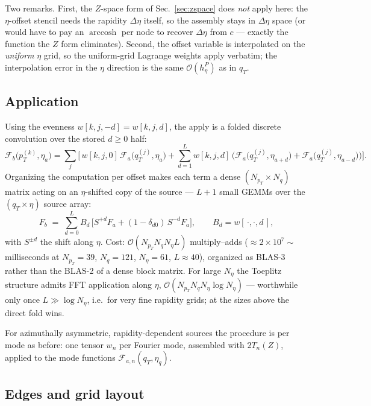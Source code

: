\documentclass[11pt]{article}
\newcommand{\Fa}{\mathcal{F}_a}
\newcommand{\Fb}{\mathcal{F}_b}
\newcommand{\Fan}{\mathcal{F}_{a,n}}
\begin{document}
Two remarks.  First, the $Z$-space form of Sec.~\ref{sec:zspace} does
\emph{not} apply here: the $\eta$-offset stencil needs the rapidity
$\Delta\eta$ itself, so the assembly stays in $\Delta\eta$ space (or
would have to pay an $\operatorname{arccosh}$ per node to recover
$\Delta\eta$ from $c$ --- exactly the function the $Z$ form eliminates).
Second, the offset variable is interpolated on the \emph{uniform} $\eta$
grid, so the uniform-grid Lagrange weights apply verbatim; the
interpolation error in the $\eta$ direction is the same
$\mathcal O(h_\eta^{P})$ as in $q_T$.

\subsection{Application}

Using the evenness $w[k,j,-d]=w[k,j,d]$, the apply is a folded discrete
convolution over the stored $d\ge0$ half:
\begin{equation}
\Fb\big(p_T^{(k)},\eta_a\big)
=\sum_{j}\Big[\,w[k,j,0]\,\Fa\big(q_T^{(j)},\eta_a\big)
+\sum_{d=1}^{L} w[k,j,d]\,
\big(\Fa\big(q_T^{(j)},\eta_{a+d}\big)+\Fa\big(q_T^{(j)},\eta_{a-d}\big)\big)
\Big].
\label{eq:toeplitz-apply}
\end{equation}
Organizing the computation per offset makes each term a dense
$(N_{p_T}\times N_q)$ matrix acting on an $\eta$-shifted copy of the
source --- $L+1$ small GEMMs over the $(q_T\!\times\!\eta)$ source array:
\begin{equation}
F_b \;=\; \sum_{d=0}^{L} B_d\,\big[S^{+d}F_a + (1-\delta_{d0})\,S^{-d}F_a\big],
\qquad B_d = w[\,\cdot,\cdot,d\,],
\end{equation}
with $S^{\pm d}$ the shift along $\eta$.  Cost:
$\mathcal O(N_{p_T}N_qN_\eta L)$ multiply--adds
($\approx 2\times10^{7}\sim$ milliseconds at
$N_{p_T}{=}39$, $N_q{=}121$, $N_\eta{=}61$, $L{\approx}40$), organized as
BLAS-3 rather than the BLAS-2 of a dense block matrix.  For large
$N_\eta$ the Toeplitz structure admits FFT application along $\eta$,
$\mathcal O(N_{p_T}N_qN_\eta\log N_\eta)$ --- worthwhile only once
$L\gg\log N_\eta$, i.e.\ for very fine rapidity grids; at the sizes above
the direct fold wins.

For azimuthally asymmetric, rapidity-dependent sources the procedure is
per mode as before: one tensor $w_n$ per Fourier mode, assembled with
$2T_n(Z)$, applied to the mode functions $\Fan(q_T,\eta_q)$.

\subsection{Edges and grid layout}
\end{document}
